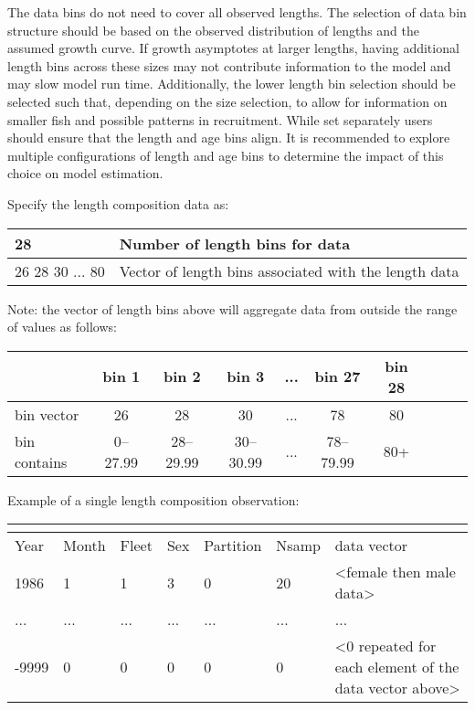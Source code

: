 The data bins do not need to cover all observed lengths.  The selection of data bin structure should be based on the observed distribution of lengths and the assumed growth curve. If growth asymptotes at larger lengths, having additional length bins across these sizes may not contribute information to the model and may slow model run time.  Additionally, the lower length bin selection should be selected such that, depending on the size selection, to allow for information on smaller fish and possible patterns in recruitment. While set separately users should ensure that the length and age bins align.  It is recommended to explore multiple configurations of length and age bins to determine the impact of this choice on model estimation.

Specify the length composition data as:
\begin{center}
	\begin{tabular}{p{4cm} p{10cm}}
		\hline
		28 & Number of length bins for data  \\
		\hline
		26 28 30 ... 80 &  Vector of length bins associated with the length data\\
		\hline
	\end{tabular}
\end{center}
Note: the vector of length bins above will aggregate data from outside
the range of values as follows:
\begin{center}
    \begin{tabular}{lccccccccc}
		\hline
  		             & bin 1 & bin 2 & bin 3 & ... & bin 27 & bin 28 \\ 
		\hline
 		bin vector   & 26 & 28 & 30 & ... & 78 & 80 \\ 
    	bin contains & 0--27.99 & 28--29.99 & 30--30.99 & ... & 78--79.99 & 80+ \\
		\hline
    \end{tabular}
\end{center}

Example of a single length composition observation:
\begin{center}
	\begin{tabular}{p{1.5cm} p{1.5cm} p{1.5cm} p{1.5cm} p{1.5cm} p{1.5cm} p{5cm}}
		\multicolumn{7}{l}{} \\
		\hline
		Year & Month & Fleet & Sex & Partition & Nsamp & data vector\Tstrut\Bstrut\\
		\hline
		1986 & 1 & 1 & 3 & 0 & 20 & <female then male data> \Tstrut\\
		... & ...& ... & ... & ...& ... & ... \\
-9999 & 0 & 0 & 0 & 0 & 0 & <0 repeated for each element of the data
vector above> \Bstrut\\
		\hline	
	\end{tabular}
\end{center}

